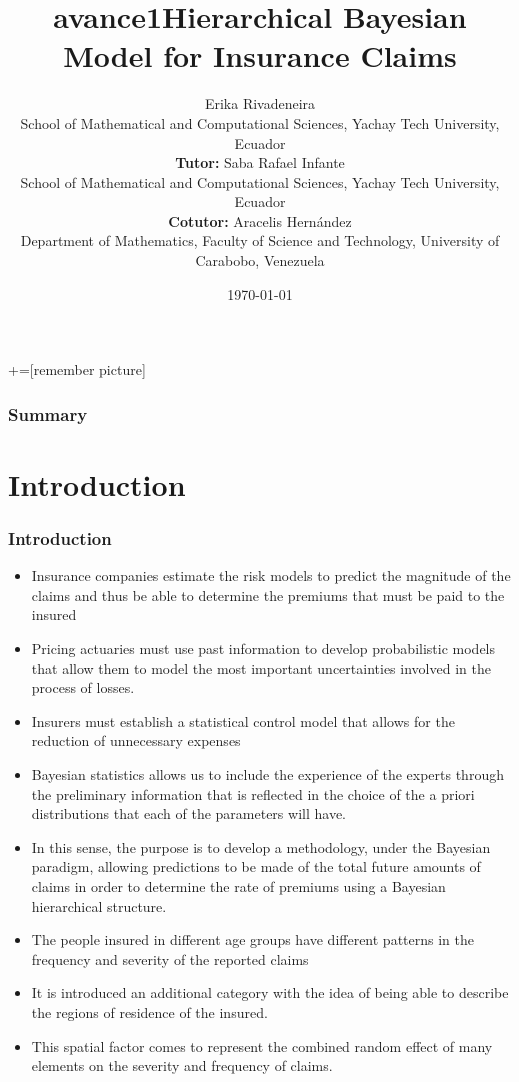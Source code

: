 \documentclass[10pt]{beamer} %
\title{avance1}
\title{Hierarchical Bayesian Model for Insurance Claims}
\author[]{Erika Rivadeneira\\ School of Mathematical and Computational Sciences, Yachay Tech University, Ecuador
\vspace{0.25cm}
\\{\small{\textbf{Tutor:} Saba Rafael Infante\\School of Mathematical and Computational Sciences, Yachay Tech University, Ecuador\\\textbf{Cotutor:} Aracelis Hernández\\Department of Mathematics, Faculty of Science and Technology, University of Carabobo, Venezuela}}}
\date{\today}
\begin{document}
+=[remember picture]
\lstset{}   
\everymath{\displaystyle}

\begin{frame}
	\titlepage
\end{frame}

\begin{frame}
\frametitle{Summary}
\tableofcontents
\end{frame}

\section{Introduction}

\begin{frame}
\frametitle[9pt]{Introduction}
\begin{itemize}
    \item Insurance companies estimate the risk models to predict the magnitude of the claims and thus be able to determine the premiums that must be paid to the insured

    \item Pricing actuaries must use past information to develop probabilistic models that allow them to model the most important uncertainties involved in the process of losses. 
    \item Insurers must establish a statistical control model that allows for the reduction of unnecessary expenses
    \item Bayesian statistics allows us to include the experience of the experts through the preliminary information that is reflected in the choice of the a priori distributions that each of the parameters will have.
    
\end{itemize}

\end{frame}
\begin{frame}
\begin{itemize}
    \item In this sense, the purpose is to develop a methodology, under the Bayesian paradigm, allowing predictions to be made of the total future amounts of claims in order to determine the rate of premiums using a Bayesian hierarchical structure.
    \item The people insured in different age groups have different patterns in the frequency and severity of the reported claims
    \item It is introduced an additional category with the idea of being able to describe the regions of residence of the insured. 
    \item This spatial factor comes to represent the combined random effect of many elements on the severity and frequency of claims. 
\end{itemize}
\end{frame}
\end{document}
